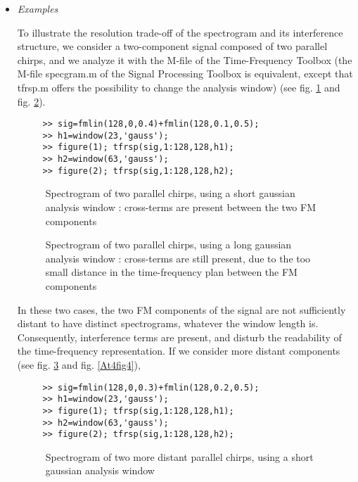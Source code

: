 \begin{itemize}
\item {\it Examples}

To illustrate the resolution trade-off of the spectrogram and its
interference structure, we consider a two-component signal composed of two
parallel chirps, and we analyze it with the M-file  of the Time-Frequency Toolbox (the M-file
{\ttfamily specgram.m} of the Signal Processing Toolbox is equivalent,
except that {\ttfamily tfrsp.m} offers the possibility to change the
analysis window) (see fig. \ref{At4fig1} and fig. \ref{At4fig2}).
\begin{verbatim}
     >> sig=fmlin(128,0,0.4)+fmlin(128,0.1,0.5);
     >> h1=window(23,'gauss'); 
     >> figure(1); tfrsp(sig,1:128,128,h1);
     >> h2=window(63,'gauss'); 
     >> figure(2); tfrsp(sig,1:128,128,h2);
\end{verbatim}
\begin{figure}[htb]
\epsfxsize=10cm
\epsfysize=8cm
\centerline{}
\caption{\label{At4fig1}Spectrogram of two parallel chirps, using a short
gaussian analysis window : cross-terms are present between the two FM
components}
\end{figure}
\begin{figure}[htb]
\epsfxsize=10cm
\epsfysize=8cm
\centerline{}
\caption{\label{At4fig2}Spectrogram of two parallel chirps, using a long
gaussian analysis window : cross-terms are still present, due to the too
small distance in the time-frequency plan between the FM components}
\end{figure}
In these two cases, the two FM components of the signal are not
sufficiently distant to have distinct spectrograms, whatever the window
length is. Consequently, interference terms are present, and disturb the
readability of the time-frequency representation. If we consider more
distant components (see fig. \ref{At4fig3} and fig. \ref{At4fig4}),
\begin{verbatim}
     >> sig=fmlin(128,0,0.3)+fmlin(128,0.2,0.5);
     >> h1=window(23,'gauss'); 
     >> figure(1); tfrsp(sig,1:128,128,h1);
     >> h2=window(63,'gauss'); 
     >> figure(2); tfrsp(sig,1:128,128,h2);
\end{verbatim}
\begin{figure}[htb]
\epsfxsize=10cm
\epsfysize=8cm
\centerline{}
\caption{\label{At4fig3}Spectrogram of two more distant parallel chirps,
using a short gaussian analysis window}
\end{figure}

\end{itemize}
